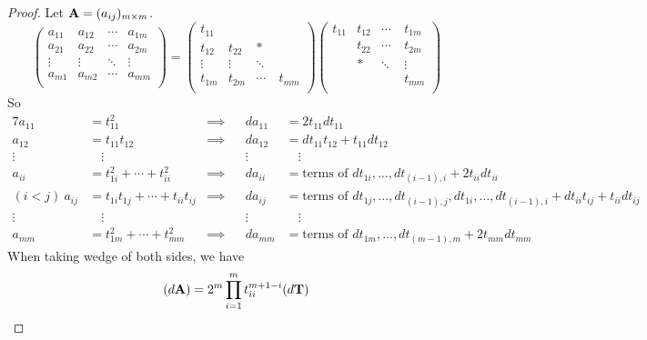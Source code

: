 \documentclass[11pt]{article}
\def\A{{\bf A}}
\def\T{{\bf T}}
\begin{document}
\begin{proof}
	Let $\A=(a_{ij})_{m\times m}$. 
	$$ 	
		\begin{pmatrix}
			a_{11}	& a_{12}	& \cdots 	& a_{1m}\\
			a_{21}	& a_{22}	& \cdots 	& a_{2m}\\
			\vdots 	& \vdots 	& \ddots 	& \vdots \\
			a_{m1} 	& a_{m2} 	& \cdots 	& a_{mm}\\
		\end{pmatrix}
		= 
		\begin{pmatrix} 
			t_{11}	&\quad	&\quad 	& \quad \\	
			t_{12}	& t_{22} 	& * 		& \quad \\
			\vdots	& \vdots	& \ddots 	& \quad \\
			t_{1m} 	& t_{2m}	& \cdots	& t_{mm}\\
		\end{pmatrix}
		\begin{pmatrix} 
			t_{11}	& t_{12}	& \cdots 	& t_{1m}\\	
			\quad	& t_{22} 	& \cdots 	& t_{2m} \\
			\quad	& *		& \ddots 	& \vdots \\
			\quad 	&\quad 	& \quad	& t_{mm}\\
		\end{pmatrix}
	$$
	So
	\begin{alignat*}{7}
		a_{11} &= t_{11}^2				&\implies	&& da_{11} &= 2t_{11}dt_{11}\\
		a_{12} &= t_{11}t_{12}			&\implies	&& da_{12} &= dt_{11}t_{12}+t_{11}dt_{12}\\
		\vdots  & \quad\vdots 				&\quad	&& \vdots    & \quad\vdots\\
		a_{ii}	   &= t_{1i}^2+\cdots+t_{ii}^2	&\implies	&& da_{ii}	  &= \text{terms\ of\ }dt_{1i},\dots,dt_{(i-1),i}+2t_{ii}dt_{ii}\\
		(i<j)\ a_{ij} &= t_{1i}t_{1j}+\cdots+t_{ii}t_{ij}	&\implies 	&& da_{ij} &= \text{terms\ of\ }dt_{1j},\dots,dt_{(i-1),j},dt_{1i},\dots,dt_{(i-1),i} +dt_{ii}t_{ij}+t_{ii}dt_{ij}\\
		\vdots  & \quad\vdots 				&\quad	&& \vdots    & \quad\vdots\\
		a_{mm}	   &= t_{1m}^2+\cdots+t_{mm}^2	&\implies	&& da_{mm}	  &= \text{terms\ of\ }dt_{1m},\dots,dt_{(m-1),m}+2t_{mm}dt_{mm}
	\end{alignat*}
	When taking wedge of both sides, we have
	\begin{equation*}
		(d\A) = 2^m \prod_{i=1}^m t_{ii}^{m+1-i} (d\T)
	\end{equation*}
\end{proof}
\end{document}
